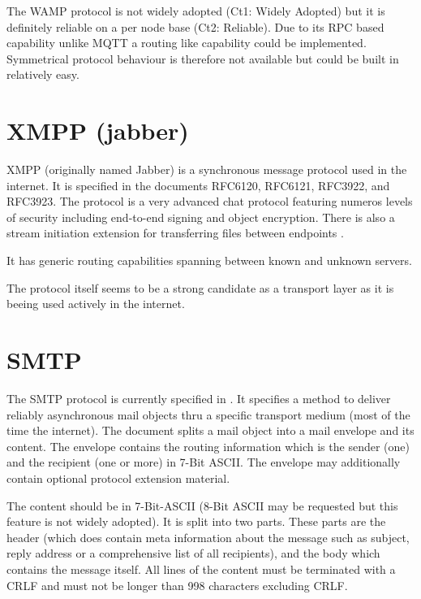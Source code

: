 The WAMP protocol is not widely adopted (Ct1: Widely Adopted) but it is definitely reliable on a per node base (Ct2: Reliable). Due to its RPC based capability unlike MQTT a routing like capability could be implemented. Symmetrical protocol behaviour is therefore not available but could be built in relatively easy.

\section{XMPP (jabber)}
XMPP (originally named Jabber) is a synchronous message protocol used in the internet. It is specified in the documents RFC6120\cite{RFC6120}, RFC6121\cite{RFC6120}, RFC3922\cite{RFC3922}, and RFC3923\cite{RFC3923}. The protocol is a very advanced chat protocol featuring numeros levels of security including end-to-end signing and object encryption\cite{RFC3923}. There is also a stream initiation extension for transferring files between endpoints \cite{xep0096}.

It has generic routing capabilities spanning between known and unknown servers.

The protocol itself seems to be a strong candidate as a transport layer as it is beeing used actively in the internet.


\section{SMTP}
The SMTP protocol is currently specified in \cite{RFC5321}. It specifies a method to deliver reliably asynchronous mail objects thru a specific transport medium (most of the time the internet). The document splits a mail object into a mail envelope and its content. The envelope contains the routing information which is the sender (one) and the recipient (one or more) in 7-Bit ASCII. The envelope may additionally contain optional protocol extension material. \par

The content should be in 7-Bit-ASCII (8-Bit ASCII may be requested but this feature is not widely adopted). It is split into two parts. These parts are the header (which does contain meta information about the message such as subject, reply address or a comprehensive list of all recipients), and the body which contains the message itself. All lines of the content must be terminated with a CRLF and must not be longer than 998 characters excluding CRLF.\par

